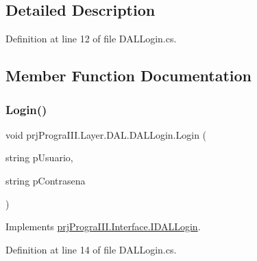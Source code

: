 \subsection{Detailed Description}


Definition at line 12 of file D\+A\+L\+Login.\+cs.



\subsection{Member Function Documentation}
\hypertarget{classprj_progra_i_i_i_1_1_layer_1_1_d_a_l_1_1_d_a_l_login_a2c7ffe6eec7104cf55cb7e7b63ba1ce1}{}\label{classprj_progra_i_i_i_1_1_layer_1_1_d_a_l_1_1_d_a_l_login_a2c7ffe6eec7104cf55cb7e7b63ba1ce1} 
\subsubsection{\texorpdfstring{Login()}{Login()}}
{\footnotesize\ttfamily void prj\+Progra\+I\+I\+I.\+Layer.\+D\+A\+L.\+D\+A\+L\+Login.\+Login (\begin{DoxyParamCaption}\item[{string}]{p\+Usuario,  }\item[{string}]{p\+Contrasena }\end{DoxyParamCaption})}



Implements \hyperlink{interfaceprj_progra_i_i_i_1_1_interface_1_1_i_d_a_l_login_a90f2596282cc596e630bd6ec13b3f245}{prj\+Progra\+I\+I\+I.\+Interface.\+I\+D\+A\+L\+Login}.



Definition at line 14 of file D\+A\+L\+Login.\+cs.


